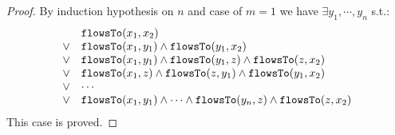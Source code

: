 \begin{proof}
By induction hypothesis on $n$ and case of $m = 1$ we have $\exists y_1, \cdots, y_n$ s.t.:
\[
\begin{array}{ll}
      & \mathtt{flowsTo}(x_1, x_2) \\
  \lor  & \mathtt{flowsTo}(x_1, y_1) \land \mathtt{flowsTo}(y_1, x_2)\\
  \lor  & \mathtt{flowsTo}(x_1, y_1) \land \mathtt{flowsTo}(y_1, z) \land \mathtt{flowsTo}(z, x_2) \\
  \lor  & \mathtt{flowsTo}(x_1, z) \land \mathtt{flowsTo}(z, y_1) \land \mathtt{flowsTo}(y_1, x_2) \\
  \lor  & \cdots \\
  \lor  & \mathtt{flowsTo}(x_1, y_1) \land \cdots \land \mathtt{flowsTo}(y_n, z) \land \mathtt{flowsTo}(z, x_2) \\
\end{array}
\]
This case is proved.
\end{proof}